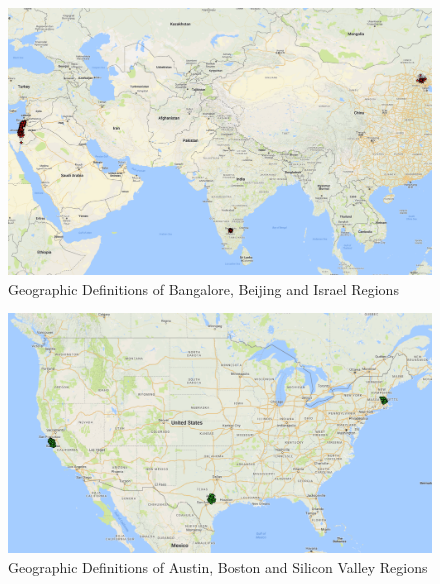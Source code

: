 \documentclass[12pt]{article}
\begin{document}
\begin{figure}[h]
\begin{centering}
  \includegraphics[width=\textwidth]{AsianClusters}
  \caption{Geographic Definitions of Bangalore, Beijing and Israel Regions}
   \label{fig:AsianClusters}
\end{centering}
\end{figure}

\begin{figure}[h]
\begin{centering}
  \includegraphics[width=\textwidth]{USClusters}
  \caption{Geographic Definitions of Austin, Boston and Silicon Valley Regions}
   \label{fig:USClusters}
\end{centering}
\end{figure}
\end{document}
